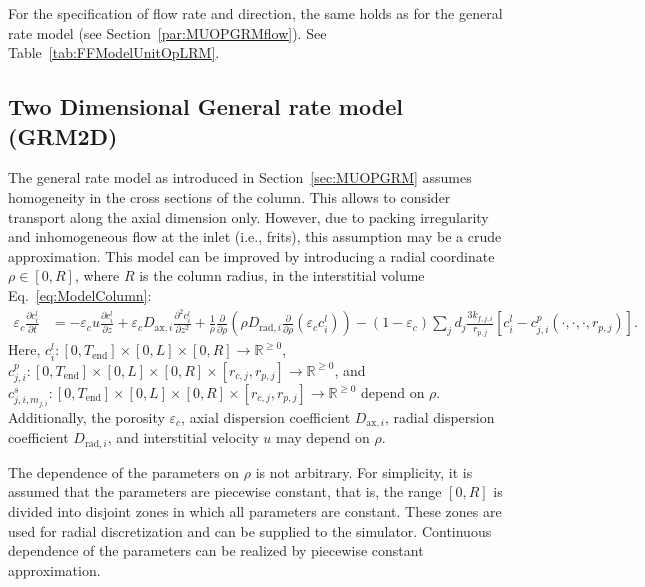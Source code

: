 For the specification of flow rate and direction, the same holds as for the general rate model (see Section~\ref{par:MUOPGRMflow}).
See Table~\ref{tab:FFModelUnitOpLRM}.

\subsection{Two Dimensional General rate model (GRM2D)}\label{sec:MUOPGRM2D}

The general rate model as introduced in Section~\ref{sec:MUOPGRM} assumes homogeneity in the cross sections of the column.
This allows to consider transport along the axial dimension only.
However, due to packing irregularity and inhomogeneous flow at the inlet (i.e., frits), this assumption may be a crude approximation.
This model can be improved by introducing a radial coordinate $\rho \in [0, R]$, where $R$ is the column radius, in the interstitial volume Eq.~\eqref{eq:ModelColumn}:
\begin{align}
	\varepsilon_c \frac{\partial c^l_i}{\partial t} &= -\varepsilon_c u \frac{\partial c^l_i}{\partial z} + \varepsilon_c D_{\text{ax},i} \frac{\partial^2 c^l_i}{\partial z^2} + \frac{1}{\rho} \frac{\partial}{\partial \rho} \left( \rho D_{\text{rad},i} \frac{\partial}{\partial \rho} \left( \varepsilon_c c^l_i \right) \right) - \left(1 - \varepsilon_c\right) \sum_j d_j \frac{ 3 k_{f,j,i} }{r_{p,j}} \left[ c^l_i - c^p_{j,i}(\cdot, \cdot, \cdot, r_{p,j}) \right]. \label{eq:ModelColumn2D}
\end{align}
Here, $c^l_i\colon \left[0, T_{\text{end}}\right] \times [0, L] \times [0, R] \rightarrow \mathds{R}^{\geq 0}$, $c^p_{j,i}\colon \left[0, T_{\text{end}}\right] \times [0, L] \times [0, R] \times [r_{c,j}, r_{p,j}] \rightarrow \mathds{R}^{\geq 0}$, and $c^s_{j,i,m_{j,i}}\colon \left[0, T_{\text{end}}\right] \times [0, L] \times [0, R] \times [r_{c,j}, r_{p,j}] \rightarrow \mathds{R}^{\geq 0}$ depend on $\rho$.
Additionally, the porosity $\varepsilon_c$, axial dispersion coefficient $D_{\text{ax},i}$, radial dispersion coefficient $D_{\text{rad},i}$, and interstitial velocity $u$ may depend on $\rho$.

The dependence of the parameters on $\rho$ is not arbitrary.
For simplicity, it is assumed that the parameters are piecewise constant, that is, the range $[0, R]$ is divided into disjoint zones in which all parameters are constant.
These zones are used for radial discretization and can be supplied to the simulator.
Continuous dependence of the parameters can be realized by piecewise constant approximation.

